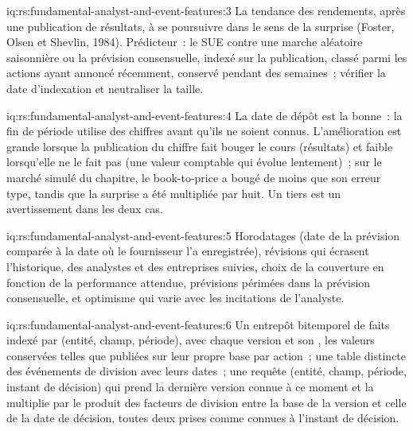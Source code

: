 \begin{solution}{iq:rs:fundamental-analyst-and-event-features:3}
La tendance des rendements, après une publication de résultats, à se poursuivre dans le sens de la surprise (Foster, Olsen et Shevlin, 1984). Prédicteur~: le SUE
contre une marche aléatoire saisonnière ou la prévision consensuelle, indexé sur la publication, classé parmi les actions ayant annoncé récemment, conservé pendant des semaines~; vérifier
la date d'indexation et neutraliser la taille.
\end{solution}

\begin{solution}{iq:rs:fundamental-analyst-and-event-features:4}
La date de dépôt est la bonne~: la fin de période utilise des chiffres avant qu'ils ne soient connus. L'amélioration est grande lorsque la publication du chiffre fait bouger le
cours (résultats) et faible lorsqu'elle ne le fait pas (une valeur comptable qui évolue lentement)~; sur le marché simulé du chapitre, le book-to-price a bougé de moins que son
erreur type, tandis que la surprise a été multipliée par huit. Un tiers est un avertissement dans les deux cas.
\end{solution}

\begin{solution}{iq:rs:fundamental-analyst-and-event-features:5}
Horodatages (date de la prévision comparée à la date où le fournisseur l'a enregistrée), révisions qui écrasent l'historique,  des analystes et des entreprises suivies,
choix de la couverture en fonction de la performance attendue, prévisions périmées dans la prévision consensuelle, et optimisme qui varie avec les incitations de l'analyste.
\end{solution}

\begin{solution}{iq:rs:fundamental-analyst-and-event-features:6}
Un entrepôt bitemporel de faits indexé par (entité, champ, période), avec chaque version et son , les valeurs conservées telles que publiées sur leur propre
base par action~; une table distincte des événements de division avec leurs dates~; une requête (entité, champ, période, instant de décision) qui prend la dernière version connue à ce moment et
la multiplie par le produit des facteurs de division entre la base de la version et celle de la date de décision, toutes deux prises comme connues à l'instant de décision.
\end{solution}
